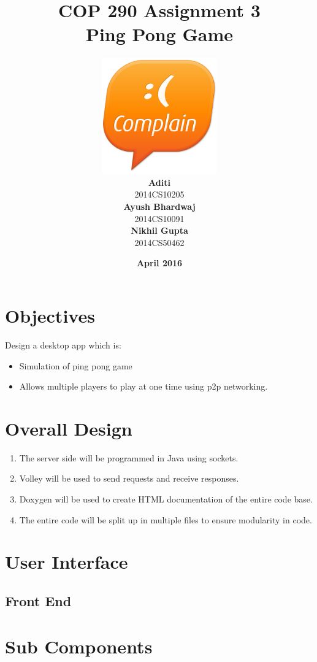 \documentclass{article}
\title{\vspace*{\fill} \textbf{COP 290 Assignment 3}
	  \\ {\Large \textbf{Ping Pong Game}}
}
\author{
	\vspace{5mm} \includegraphics[width=5cm]{logo.png} \\
	 \textbf{Aditi}\\
	2014CS10205 \vspace{2mm} \\
	\textbf{Ayush Bhardwaj}\\ 
	2014CS10091 \vspace{2mm} \\
	\textbf{Nikhil Gupta}\\ 
	2014CS50462 \vspace{2mm}
}
\date{\vspace{3mm} \textbf{April 2016} \vspace*{\fill}}
\begin{document}
	\maketitle

	\newpage

	\tableofcontents

	\newpage

	\section{Objectives}
	Design a desktop app which is:
	\begin{itemize}
	\item Simulation of ping pong game
	\item Allows multiple players to play at one time using p2p networking.
	\end{itemize}

	\section{Overall Design}
				\begin{enumerate}
			\item The server side will be programmed in Java using sockets.
			\item Volley will be used to send requests and receive responses.
			\item Doxygen will be used to create HTML documentation of the entire code base.
			\item The entire code will be split up in multiple files to ensure modularity in code. 
		\end{enumerate}
	\section{User Interface}
	

    	\subsection{Front End}


	\section{Sub Components}
\end{document}
